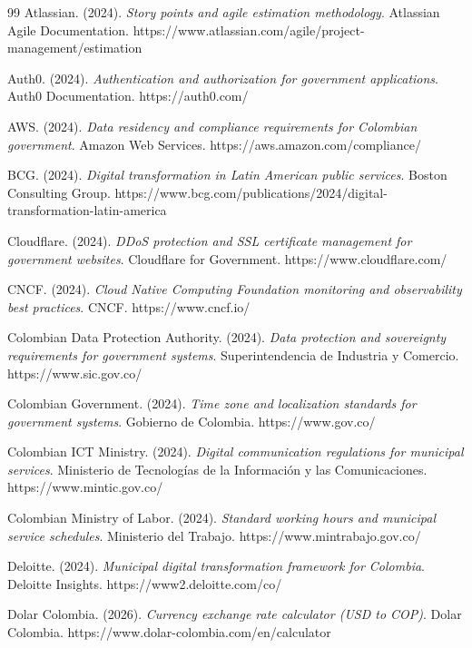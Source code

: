 \documentclass[12pt,a4paper]{article}
\begin{document}
\begin{thebibliography}{99}
 Atlassian. (2024). \emph{Story points and agile estimation methodology}. Atlassian Agile Documentation. https://www.atlassian.com/agile/project-management/estimation

 Auth0. (2024). \emph{Authentication and authorization for government applications}. Auth0 Documentation. https://auth0.com/

 AWS. (2024). \emph{Data residency and compliance requirements for Colombian government}. Amazon Web Services. https://aws.amazon.com/compliance/

 BCG. (2024). \emph{Digital transformation in Latin American public services}. Boston Consulting Group. https://www.bcg.com/publications/2024/digital-transformation-latin-america

 Cloudflare. (2024). \emph{DDoS protection and SSL certificate management for government websites}. Cloudflare for Government. https://www.cloudflare.com/

 CNCF. (2024). \emph{Cloud Native Computing Foundation monitoring and observability best practices}. CNCF. https://www.cncf.io/

 Colombian Data Protection Authority. (2024). \emph{Data protection and sovereignty requirements for government systems}. Superintendencia de Industria y Comercio. https://www.sic.gov.co/

 Colombian Government. (2024). \emph{Time zone and localization standards for government systems}. Gobierno de Colombia. https://www.gov.co/

 Colombian ICT Ministry. (2024). \emph{Digital communication regulations for municipal services}. Ministerio de Tecnologías de la Información y las Comunicaciones. https://www.mintic.gov.co/

 Colombian Ministry of Labor. (2024). \emph{Standard working hours and municipal service schedules}. Ministerio del Trabajo. https://www.mintrabajo.gov.co/

 Deloitte. (2024). \emph{Municipal digital transformation framework for Colombia}. Deloitte Insights. https://www2.deloitte.com/co/

 Dolar Colombia. (2026). \emph{Currency exchange rate calculator (USD to COP)}. Dolar Colombia. https://www.dolar-colombia.com/en/calculator


\end{thebibliography}
\end{document}
